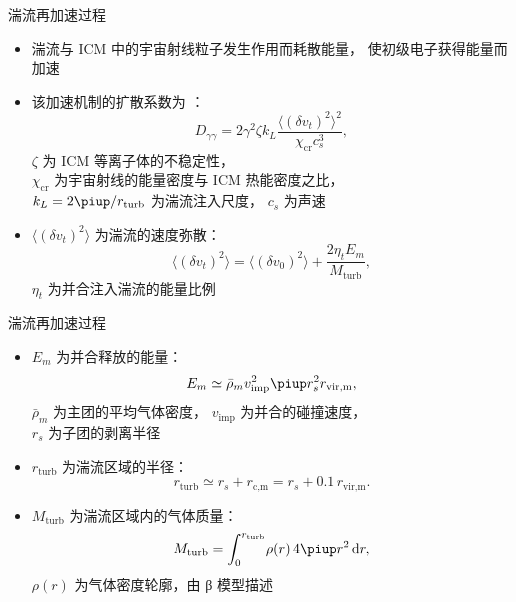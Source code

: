 \documentclass{beamer}
\newcommand{\R}[1]{\text{#1}}  %
\newcommand{\Cpi}{\piup}  %
\newcommand{\D}[1]{\R{d}#1}
\begin{document}
\begin{frame}
  \vspace{1ex}
  \begin{alertblock}{湍流再加速过程}
    \smallskip
    \begin{itemize}
      \item 湍流与 ICM 中的宇宙射线粒子发生作用而耗散能量，
        使初级电子获得能量而加速 \cite{brunetti2011}
      \item 该加速机制的扩散系数为 \cite{miniati2015}：
        \begin{equation}
          D_{\gamma\gamma} =
            2 \gamma^2 \zeta k_L
            \frac{\langle (\delta v_t)^2 \rangle^2}{\chi_{\R{cr}} c_s^3} ,
        \end{equation}
        $\zeta$ 为 ICM 等离子体的不稳定性，\\
        $\chi_{\R{cr}}$ 为宇宙射线的能量密度与 ICM 热能密度之比，\\
        $k_L = 2\Cpi / r_{\R{turb}}$ 为湍流注入尺度，
        $c_s$ 为声速
      \item $\langle (\delta v_t)^2 \rangle$ 为湍流的速度弥散：
        \begin{equation}
          \langle (\delta v_t)^2 \rangle =
            \langle (\delta v_0)^2 \rangle +
            \frac{2 \eta_t E_m}{M_{\R{turb}}} ,
        \end{equation}
        $\eta_t$ 为并合注入湍流的能量比例
    \end{itemize}
  \end{alertblock}
\end{frame}

\begin{frame}
  \vspace{1ex}
  \begin{alertblock}{湍流再加速过程}
    \smallskip
    \begin{itemize}
      \item $E_m$ 为并合释放的能量：
        \begin{equation}
          E_m \simeq \bar{\rho}_m v_{\R{imp}}^2
            \Cpi r_s^2 r_{\R{vir,m}} ,
        \end{equation}
        $\bar{\rho}_m$ 为主团的平均气体密度，
        $v_{\R{imp}}$ 为并合的碰撞速度，\\
        $r_s$ 为子团的剥离半径
      \item $r_{\R{turb}}$ 为湍流区域的半径：
        \begin{equation}
          r_{\R{turb}} \simeq r_s + r_{\R{c,m}}
            = r_s + 0.1\,r_{\R{vir,m}} .
        \end{equation}
      \item $M_{\R{turb}}$ 为湍流区域内的气体质量：
        \begin{equation}
          M_{\R{turb}} =
            \int_0^{r_{\R{turb}}} \! \rho(r) \,4\Cpi r^2 \,\D{r} ,
        \end{equation}
        $\rho(r)$ 为气体密度轮廓，由 β 模型描述
    \end{itemize}
  \end{alertblock}
\end{frame}
\end{document}
